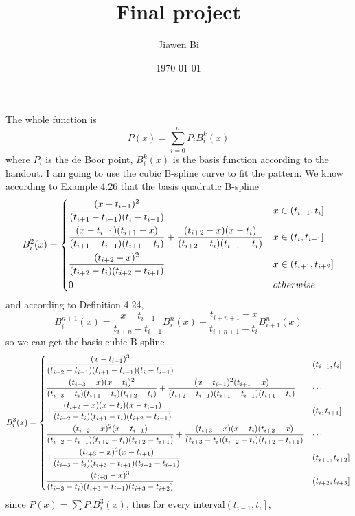 \documentclass[]{article}
\title{Final project}
\author{Jiawen Bi}
\date{\today}
\begin{document}
\maketitle
The whole function is $$
    P(x) = \sum_{i=0}^n P_i B_i^k(x)
   	$$
where $P_i$ is the de Boor point, $B_i^k(x)$ is the basis function according to the handout. 
I am going to use the cubic B-spline curve to fit the pattern.
We know according to Example 4.26 that the basis quadratic B-spline $$
	B_i^2(x) = \begin{dcases}
	\frac{(x-t_{i-1})^2}{(t_{i+1}-t_{i-1})(t_i - t_{i-1})} & x\in \left(t_{i-1},t_i\right] \\
	\frac{(x-t_{i-1})(t_{i+1}-x)}{(t_{i+1}-t_{i-1})(t_{i+1}-t_i)} + \frac{(t_{i+2}-x)(x-t_i)}{(t_{i+2}-t_i)(t_{i+1}-t_i)} & x\in \left(t_i,t_{i+1}\right] \\
	\frac{(t_{i+2}-x)^2}{(t_{i+2}-t_i)(t_{i+2}-t_{i+1})} & x\in \left(t_{i+1},t_{i+2} \right] \\
	0 & otherwise
	\end{dcases}
$$
and according to Definition 4.24, $$
	B_i^{n+1}(x) = \frac{x-t_{i-1}}{t_{i+n}-t_{i-1}}B_i^n(x) + \frac{t_{i+n+1} - x}{t_{i+n+1}-t_i} B_{i+1}^n(x)
$$
so we can get the basis cubic B-spline $$
	B_i^3(x) = \begin{dcases}
	\frac{(x-t_{i-1})^3}{(t_{i+2}-t_{i-1})(t_{i+1}-t_{i-1})(t_i-t_{i-1})} & \left(t_{i-1},t_i\right] \\
	\frac{(t_{i+3}-x)(x-t_{i})^2}{(t_{i+3}-t_i)(t_{i+1}-t_{i})(t_{i+2}-t_{i})} + \frac{(x-t_{i-1})^2(t_{i+1}-x)}{(t_{i+2}-t_{i-1})(t_{i+1}-t_{i-1})(t_{i+1}-t_i)} & \cdots \\ 
	 + \frac{(t_{i+2}-x)(x-t_i)(x-t_{i-1})}{(t_{i+2}-t_i)(t_{i+1}-t_i)(t_{i+2}-t_{i-1})} & \left(t_i,t_{i+1} \right] \\
	\frac{(t_{i+2}-x)^2(x-t_{i-1})}{(t_{i+2}-t_{i-1})(t_{i+2}-t_i)(t_{i+2}-t_{i+1})} + \frac{(t_{i+3}-x)(x-t_{i})(t_{i+2}-x)}{(t_{i+3}-t_i)(t_{i+2}-t_{i})(t_{i+2}-t_{i+1})} & \cdots\\
	+\frac{(t_{i+3}-x)^2(x-t_{i+1})}{(t_{i+3}-t_i)(t_{i+3}-t_{i+1})(t_{i+2}-t_{i+1})} & \left(t_{i+1},t_{i+2} \right] \\
	\frac{(t_{i+3}-x)^3}{(t_{i+3}-t_i)(t_{i+3}-t_{i+1})(t_{i+3}-t_{i+2})} & \left(t_{i+2},t_{i+3} \right]
	\end{dcases}
$$
since $\displaystyle P(x) = \sum P_iB_i^3(x) $, thus for every interval$\displaystyle\left(t_{i-1},t_i\right]$,
\end{document}
